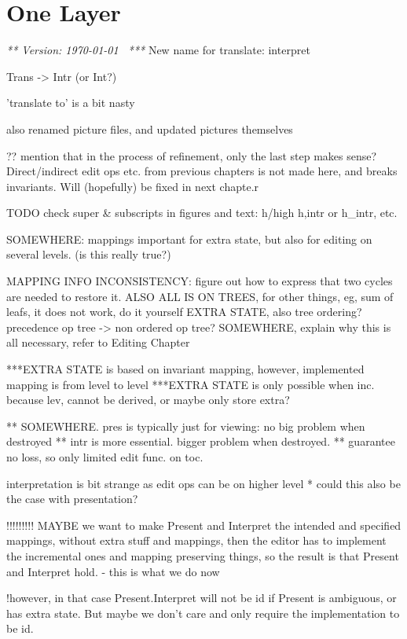 \chapter{One Layer}
\label{chap:singleLayer}

{\em *** Version: \today~ ***}
\bc
New name for translate:
interpret

Trans -> Intr  (or Int?)


'translate to' is a bit nasty

also renamed picture files, and updated pictures themselves


?? mention that in the process of refinement, only the last step makes sense? Direct/indirect edit ops etc. from previous chapters is not made here, and breaks invariants. Will (hopefully) be fixed in next chapte.r


TODO
check super & subscripts in figures and text: h/high h,intr or h_intr, etc.

SOMEWHERE: mappings important for extra state, but also for editing on several levels. (is this really true?)

MAPPING INFO INCONSISTENCY: figure out how to express that two cycles are needed to restore it.
ALSO ALL IS ON TREES, for other things, eg, sum of leafs, it does not work, do it yourself
EXTRA STATE, also tree ordering? precedence op tree -> non ordered op tree?
SOMEWHERE, explain why this is all necessary, refer to Editing Chapter


***EXTRA STATE is based on invariant mapping, however, implemented mapping is from level to level
***EXTRA STATE is only possible when inc. because lev, cannot be derived, or maybe only store extra?

** SOMEWHERE. pres is typically just for viewing: no big problem when destroyed
** intr is more essential. bigger problem when destroyed.
** guarantee no loss, so only limited edit func. on toc.

interpretation is bit strange as edit ops can be on higher level
* could this also be the case with presentation?


!!!!!!!!!
MAYBE we want to make Present and Interpret the intended and specified mappings, 
without extra stuff and mappings, then the editor has to implement the incremental ones
 and mapping preserving things, so the result is that Present and Interpret hold.
- this is what we do now

!however, in that case Present.Interpret will not be id if Present is ambiguous, or 
has extra state. But maybe we don't care and only require the implementation to be id.

